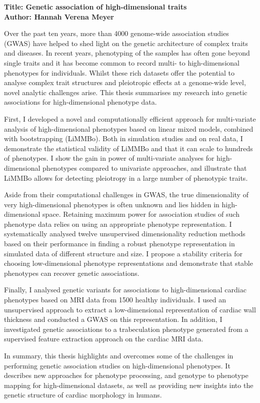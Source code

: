 \documentclass{thesis}
\begin{document}
\noindent\textbf{Title: Genetic association of high-dimensional traits}
\\
\textbf{Author: Hannah Verena Meyer}
\\
\begin{singlespace}
Over the past ten years, more than \num{4000} genome-wide association studies (GWAS) have helped to shed light on the genetic architecture of complex traits and diseases. In recent years, phenotyping of the samples has often gone beyond single traits and it has become common to record multi- to high-dimensional phenotypes for individuals. Whilst these rich datasets offer the potential to analyse complex trait structures and pleiotropic effects at a genome-wide level, novel analytic challenges arise. This thesis summarises my research into genetic associations for high-dimensional phenotype data.

First, I developed a novel and computationally efficient approach for multi-variate analysis of high-dimensional phenotypes based on linear mixed models, combined with bootstrapping (LiMMBo). Both in simulation studies and on real data, I demonstrate the statistical validity of LiMMBo and that it can scale to hundreds of phenotypes. I show the gain in power of multi-variate analyses for high-dimensional phenotypes compared to univariate approaches, and illustrate that LiMMBo allows for detecting pleiotropy in a large number of phenotypic traits.

Aside from their computational challenges in GWAS, the true dimensionality of very high-dimensional phenotypes is often unknown and lies hidden in high- dimensional space. Retaining maximum power for association studies of such phenotype data relies on using an appropriate phenotype representation. I systematically analysed twelve unsupervised dimensionality reduction methods based on their performance in finding a robust phenotype representation in simulated data of different structure and size. I propose a stability criteria for choosing low-dimensional phenotype representations and demonstrate that stable phenotypes can recover genetic associations.

Finally, I analysed genetic variants for associations to high-dimensional cardiac phenotypes based on MRI data from \num{1500} healthy individuals. I used an unsupervised approach to extract a low-dimensional representation of cardiac wall thickness and conducted a GWAS on this representation. In addition, I investigated genetic associations to a trabeculation phenotype generated from a supervised feature extraction approach on the cardiac MRI data.

In summary, this thesis highlights and overcomes some of the challenges in performing genetic association studies on high-dimensional phenotypes. It describes new approaches for phenotype processing, and genotype to phenotype mapping for high-dimensional datasets, as well as providing new insights into the genetic structure of cardiac morphology in humans.
\end{singlespace}
\end{document}
